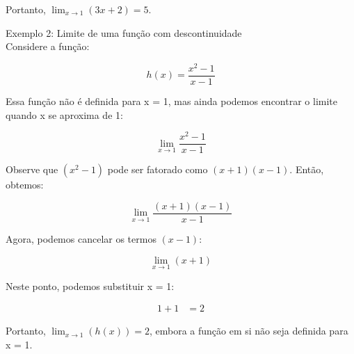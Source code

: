 \documentclass[analysis_notes.tex]{subfiles}
\begin{document}
\begin{enumerate}
	      Portanto, $\lim_{x \to 1} (3x + 2) = 5$.

	      \begin{center}
	      \end{center}

	      Exemplo 2: Limite de uma função com descontinuidade \\
	      Considere a função:

	      \begin{equation*}
		      h(x) = \frac{x^2 - 1}{x - 1}
	      \end{equation*}

	      Essa função não é definida para x = 1, mas ainda podemos encontrar o limite quando x se aproxima de 1:

	      \begin{equation*}
		      \lim_{x \to 1} \frac{x^2 - 1}{x - 1}
	      \end{equation*}

	      Observe que $(x^2 - 1)$ pode ser fatorado como $(x + 1)(x - 1)$. Então, obtemos:

	      \begin{equation*}
		      \lim_{x \to 1} \frac{(x + 1)(x - 1)}{x - 1}
	      \end{equation*}

	      Agora, podemos cancelar os termos $(x - 1)$:

	      \begin{equation*}
		      \lim_{x \to 1} (x + 1)
	      \end{equation*}

	      Neste ponto, podemos substituir x = 1:

	      \begin{align*}
		      1 + 1 & = 2
	      \end{align*}

	      Portanto, $\lim_{x \to 1} (h(x)) = 2$, embora a função em si não seja definida para x = 1.

	      \begin{center}
	      \end{center}
\end{enumerate}
\end{document}
